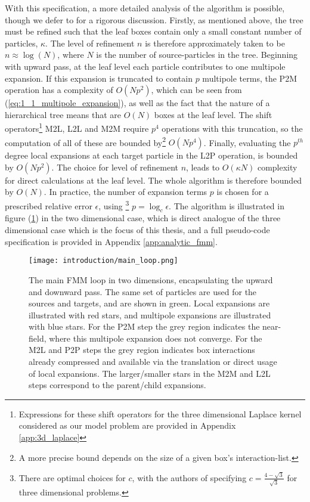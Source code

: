 With this specification, a more detailed analysis of the algorithm is possible,
though we defer to \cite{Greengard:1987:JCP} for a rigorous discussion.
Firstly, as mentioned above, the tree must be refined such that the leaf boxes
contain only a small constant number of particles, $\kappa$. The level of refinement $n$
is therefore approximately taken to be $n \approx \log(N)$, where $N$ is the number
of \gls{source-particles} in the tree. Beginning with upward pass, at the leaf level each particle contributes to one
multipole expansion. If this expansion is truncated to contain $p$ multipole terms, the
\gls{P2M} operation has a complexity of $O(Np^2)$, which can be seen from
(\ref{eq:1_1_multipole_expansion}), as well as the fact that the nature of a
hierarchical tree means that are $O(N)$ boxes at the leaf level. The shift operators\footnote{
    Expressions for these shift operators for the three dimensional Laplace kernel
    considered as our model problem are provided in Appendix \ref{app:3d_laplace}
} \gls{M2L}, \gls{L2L} and \gls{M2M} require $p^4$ operations with this truncation,
so the computation of all of these are bounded by\footnote{A more precise
bound depends on the size of a given box's \gls{interaction-list}.} $O(Np^4)$. Finally,
evaluating the $p^{th}$ degree local expansions at each target particle in the
\gls{L2P} operation, is bounded by $O(Np^2)$. The choice for level of refinement
$n$, leads to $O(\kappa N)$ complexity for direct calculations at the
leaf level. The whole algorithm is therefore bounded by $O(N)$.
In practice, the number of expansion terms $p$ is chosen for a prescribed relative error $\epsilon$, using
\footnote{There are optimal choices for $c$, with the authors of \cite{Ying:2004:JCP}
specifying $c=\frac{4-\sqrt{3}}{\sqrt{3}}$ for three dimensional problems.}
$p=\log_c \epsilon$. The algorithm is illustrated in figure (\ref{fig:1_1_main_loop})
in the two dimensional case, which is direct analogue of the three dimensional case
which is the focus of this thesis, and a full pseudo-code specification is
provided in Appendix \ref{app:analytic_fmm}.

\begin{figure}[!h]
    \centering
    {\texttt{[image: introduction/main\_loop.png]}}
  \caption{
      The main FMM loop in two dimensions, encapsulating the upward and downward
      pass. The same set of particles are used for the sources and targets, and
      are shown in green. Local expansions are illustrated with red stars, and
      multipole expansions are illustrated with blue stars. For the P2M step the
      grey region indicates the \gls{near-field}, where this multipole expansion
      does not converge. For the M2L and P2P steps the grey region indicates
      box interactions already compressed and available via the translation or
      direct usage of local expansions. The larger/smaller stars in the M2M and
      L2L steps correspond to the parent/child expansions.
  }
  \label{fig:1_1_main_loop}
\end{figure}

